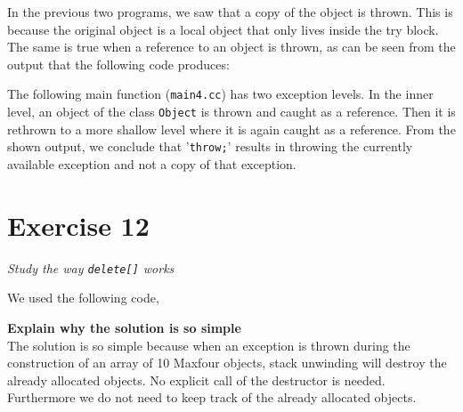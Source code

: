 \documentclass[12pt]{article}
\newcommand{\desc}[1]{\textit{#1} \vspace{1em}}
\begin{document}
\vspace{0.5cm}
In the previous two programs, we saw that a copy of the object is thrown. This is because the original object is a local object that only lives inside the try block. The same is true when a reference to an object is thrown, as can be seen from the output that the following code produces:



\vspace{0.5cm}
The following main function (\texttt{main4.cc}) has two exception levels. In the inner level, an object of the class \texttt{Object} is thrown and caught as a reference. Then it is rethrown to a more shallow level where it is again caught as a reference. From the shown output, we conclude that '\texttt{throw;}' results in throwing the currently available exception and not a copy of that exception.




\clearpage
\section*{Exercise 12}
\desc{Study the way \texttt{delete[]} works}

We used the following code,








%

\textbf{Explain why the solution is so simple}\\
The solution is so simple because when an exception is thrown during the construction of an array of 10 Maxfour objects, stack unwinding will destroy the already allocated objects. No explicit call of the destructor is needed. Furthermore we do not need to keep track of the already allocated objects. 
\end{document}
